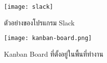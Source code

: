 \begin{figure}[!h]
	\centering
	\texttt{[image: slack]}  
	\caption{ตัวอย่างของโปรแกรม Slack}
	\label{Fig:slack}
\end{figure}

\begin{figure}[!h]
	\centering
	\texttt{[image: kanban-board.png]}  
	\caption{Kanban Board ที่ตั้งอยู่ในพื้นที่ทำงาน}
	\label{Fig:kanban-board}
\end{figure}